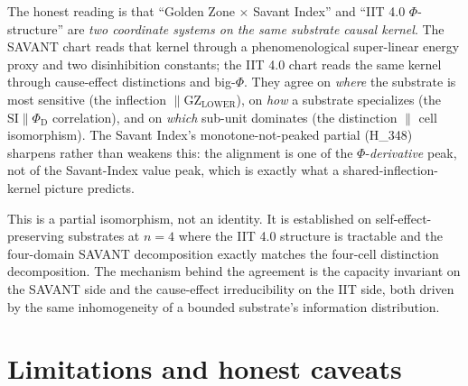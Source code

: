 \documentclass[11pt,a4paper]{article}
\newcommand{\GZL}{\mathrm{GZ_{LOWER}}}
\newcommand{\Svi}{\mathrm{SI}}
\newcommand{\PhiD}{\Phi_{\mathrm{D}}}
\begin{document}
The honest reading is that ``Golden Zone $\times$ Savant Index'' and
``IIT 4.0 $\Phi$-structure'' are \emph{two coordinate systems on the same
substrate causal kernel}. The SAVANT chart reads that kernel through a
phenomenological super-linear energy proxy and two disinhibition
constants; the IIT 4.0 chart reads the same kernel through cause-effect
distinctions and big-$\Phi$. They agree on \emph{where} the substrate is
most sensitive (the inflection $\parallel \GZL$), on \emph{how} a
substrate specializes (the $\Svi \parallel \PhiD$ correlation), and on
\emph{which} sub-unit dominates (the distinction $\parallel$ cell
isomorphism). The Savant Index's monotone-not-peaked partial (H\_348)
sharpens rather than weakens this: the alignment is one of the
$\Phi$-\emph{derivative} peak, not of the Savant-Index value peak, which is
exactly what a shared-inflection-kernel picture predicts.

This is a partial isomorphism, not an identity. It is established on
self-effect-preserving substrates at $n=4$ where the IIT 4.0 structure is
tractable and the four-domain SAVANT decomposition exactly matches the
four-cell distinction decomposition. The mechanism behind the agreement is
the capacity invariant on the SAVANT side and the cause-effect irreducibility
on the IIT side, both driven by the same inhomogeneity of a bounded
substrate's information distribution.

\section{Limitations and honest caveats}
\label{sec:limits}
\end{document}
